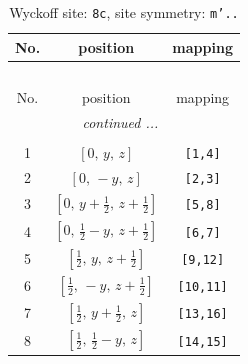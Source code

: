 \documentclass[fleqn,8pt]{jsarticle}
\begin{document}
\begin{longtable}{ccc}
\caption{Wyckoff site: {\tt 8c}, site symmetry: {\tt m'..}}
 \\
 \hline \hline
No. & position & mapping \\ \hline \endfirsthead

\multicolumn{2}{l}{\tablename\ \thetable{}} \\
 \hline \hline
No. & position & mapping \\ \hline \endhead

 \hline \hline
\multicolumn{2}{r}{\footnotesize\it continued ...} \\ \endfoot

 \hline \hline
\multicolumn{2}{r}{} \\ \endlastfoot

1 & $\left[ 0,\, y,\, z \right]$ & {\tt [1,4]} \\ \hline
2 & $\left[ 0,\, - y,\, z \right]$ & {\tt [2,3]} \\ \hline
3 & $\left[ 0,\, y + \frac{1}{2},\, z + \frac{1}{2} \right]$ & {\tt [5,8]} \\ \hline
4 & $\left[ 0,\, \frac{1}{2} - y,\, z + \frac{1}{2} \right]$ & {\tt [6,7]} \\ \hline
5 & $\left[ \frac{1}{2},\, y,\, z + \frac{1}{2} \right]$ & {\tt [9,12]} \\ \hline
6 & $\left[ \frac{1}{2},\, - y,\, z + \frac{1}{2} \right]$ & {\tt [10,11]} \\ \hline
7 & $\left[ \frac{1}{2},\, y + \frac{1}{2},\, z \right]$ & {\tt [13,16]} \\ \hline
8 & $\left[ \frac{1}{2},\, \frac{1}{2} - y,\, z \right]$ & {\tt [14,15]} \\
\end{longtable}
\renewcommand{\arraystretch}{1.2}
\end{document}
